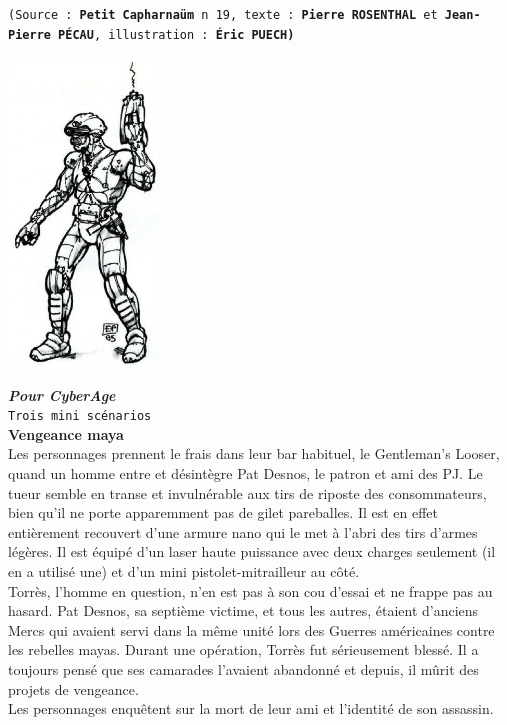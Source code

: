 \documentclass[11pt,twoside,a4paper]{article}
\begin{document}
\texttt{\scriptsize{(Source : \textbf{Petit Capharna{\"u}m} n 19, texte : \textbf{Pierre ROSENTHAL} et \textbf{Jean-Pierre P{\'E}CAU}, illustration : \textbf{{\'E}ric PUECH)} }}~\\

\begin{multicols*}{3}
\footnotesize{

\includegraphics[width=0.30\textwidth]{img/persoRunnerGun.jpg}

\textbf{\textit{Pour CyberAge}}~\\

\texttt{Trois mini sc{\'e}narios}~\\

\textbf{Vengeance maya}~\\

Les personnages prennent le frais dans leur bar habituel, le Gentleman's Looser, quand un homme entre et d{\'e}sint{\`e}gre Pat Desnos, le patron et ami des PJ. Le tueur semble en transe et invuln{\'e}rable aux tirs de riposte des consommateurs, bien qu'il ne porte apparemment pas de gilet pareballes. Il est en effet enti{\`e}rement recouvert d'une armure nano qui le met {\`a} l'abri des tirs d'armes l{\'e}g{\`e}res. Il est {\'e}quip{\'e} d'un laser haute puissance avec deux charges seulement (il en a utilis{\'e} une) et d'un mini pistolet-mitrailleur au c{\^o}t{\'e}.~\\

Torr{\`e}s, l'homme en question, n'en est pas {\`a} son cou d'essai et ne frappe pas au hasard. Pat Desnos, sa septi{\`e}me victime, et tous les autres, {\'e}taient d'anciens Mercs qui avaient servi dans la m{\^e}me unit{\'e} lors des Guerres am{\'e}ricaines contre les rebelles mayas. Durant une op{\'e}ration, Torr{\`e}s fut s{\'e}rieusement bless{\'e}. Il a toujours pens{\'e} que ses camarades l'avaient abandonn{\'e} et depuis, il m{\^u}rit des projets de vengeance.~\\
Les personnages enqu{\^e}tent sur la mort de leur ami et l'identit{\'e} de son assassin.~\\

}
\end{multicols*}
\end{document}
